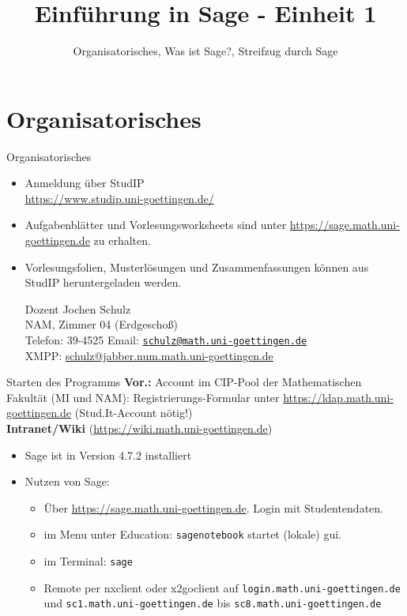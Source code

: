 \documentclass[notes=hide,hyperref={dvipdfmx,pdfpagelabels=false}]{beamer}
\title{Einführung in Sage - Einheit 1}
\subtitle{Organisatorisches, Was ist Sage?, Streifzug durch Sage}
\begin{document}
\maketitle
%
\section*{Organisatorisches}

\begin{frame}{Organisatorisches}
\begin{itemize}
\item Anmeldung über StudIP \\
      \url{https://www.studip.uni-goettingen.de/}

{\color{blue}{Einführung in Sage (Mathematische Anwendersysteme) (WS 2011/2012)}}
\item Aufgabenblätter und  Vorlesungsworksheets sind unter \url{https://sage.math.uni-goettingen.de} zu erhalten.
\item Vorlesungsfolien, Musterlösungen und Zusammenfassungen können aus StudIP heruntergeladen werden. 
\pause
\begin{block}{Dozent}
Jochen Schulz\\
NAM, Zimmer 04 (Erdgescho{\ss})\\
Telefon: 39-4525
Email: \href{mailto:schulz@math.uni-goettingen.de}{\texttt{schulz@math.uni-goettingen.de}}\\
XMPP: \url{schulz@jabber.num.math.uni-goettingen.de}\\

\end{block}
\end{itemize}
\end{frame}

\begin{frame}{Starten des Programms}
\textbf{Vor.:} Account im CIP-Pool der Mathematischen Fakultät (MI und NAM): Registrierungs-Formular unter \url{https://ldap.math.uni-goettingen.de} (\alert{Stud.It-Account} nötig!)\\
\textbf{Intranet/Wiki} (\url{https://wiki.math.uni-goettingen.de})
\begin{itemize}
\item Sage ist in Version 4.7.2 installiert
\item Nutzen von Sage: 
\begin{itemize}
\item Über \url{https://sage.math.uni-goettingen.de}. Login mit Studentendaten.
\item im Menu unter Education: \texttt{sagenotebook} startet (lokale) gui.\\
\item im Terminal: \texttt{sage}
\item Remote per \alert{nxclient} oder \alert{x2goclient}
auf \texttt{login.math.uni-goettingen.de} und \texttt{sc1.math.uni-goettingen.de} bis 
\texttt{sc8.math.uni-goettingen.de}
\end{itemize}
\end{itemize}
\end{frame}
\end{document}
